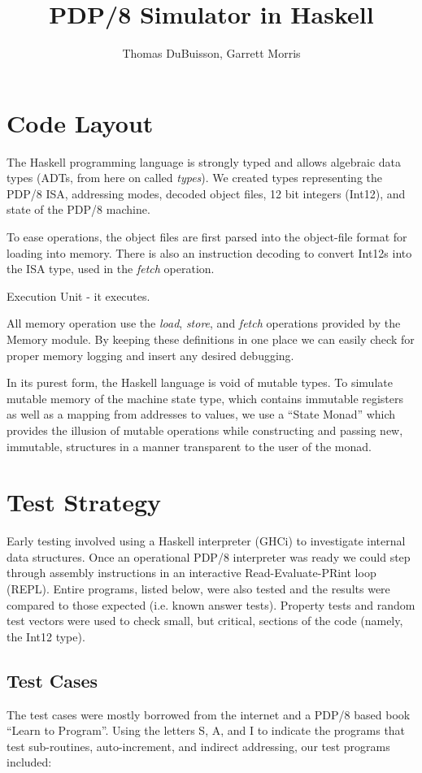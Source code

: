\documentclass[11pt]{exam}
\title{PDP/8 Simulator in Haskell}
\author{Thomas DuBuisson, Garrett Morris}
\begin{document}
\maketitle

\section{Code Layout}
The Haskell programming language is strongly typed and allows
algebraic data types (ADTs, from here on called {\em types}).  We
created types representing the PDP/8 ISA, addressing modes, decoded
object files, 12 bit integers (Int12), and state of the PDP/8 machine.

To ease operations, the object files are first parsed into the object-file
format for loading into memory.  There is also an instruction decoding to
convert Int12s into the ISA type, used in the {\em fetch} operation.

Execution Unit - it executes.

All memory operation use the {\em load}, {\em store}, and {\em fetch} operations
provided by the Memory module.  By keeping these definitions in one place we can
easily check for proper memory logging and insert any desired debugging.

In its purest form, the Haskell language is void of mutable types.  To
simulate mutable memory of the machine state type, which contains
immutable registers as well as a mapping from addresses to values, we
use a ``State Monad'' which provides the illusion of mutable
operations while constructing and passing new, immutable, structures in
a manner transparent to the user of the monad.

\section{Test Strategy}
Early testing involved using a Haskell interpreter (GHCi) to
investigate internal data structures.  Once an operational PDP/8
interpreter was ready we could step through assembly instructions in
an interactive Read-Evaluate-PRint loop (REPL).  Entire programs,
listed below, were also tested and the results were compared to those
expected (i.e. known answer tests).  Property tests and random test
vectors were used to check small, but critical, sections of the code
(namely, the Int12 type).

\subsection{Test Cases}
The test cases were mostly borrowed from the internet and a PDP/8
based book ``Learn to Program''.  Using the letters S, A, and I to
indicate the programs that test sub-routines, auto-increment, and
indirect addressing, our test programs included:
\end{document}
